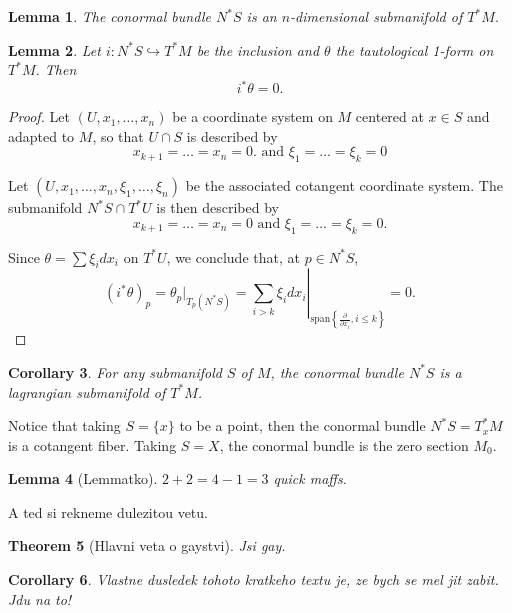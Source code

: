 \documentclass{article}
\newtheorem{theorem}{Theorem}
\newtheorem{lemma}[theorem]{Lemma} %
\newtheorem{corollary}[theorem]{Corollary}
\theoremstyle{definition}
\begin{document}
\begin{lemma}
    The conormal bundle $N^*S$ is an $n$-dimensional submanifold of $T^*M$.
\end{lemma}

\begin{lemma}
    Let $i: N^*S \hookrightarrow T^*M$ be the inclusion and $\theta$ the tautological 1-form on $T^*M$. Then
    \begin{equation*}
        i^*\theta = 0.
    \end{equation*}
\end{lemma}

\begin{proof}
    Let $(U, x_1, \ldots, x_n)$ be a coordinate system on $M$ centered at $x \in S$ and adapted to $M$, so that $U \cap S$ is described by 
    \begin{equation*}
        x_{k+1} = \ldots = x_n = 0. \text{ and } \xi_1 = \ldots = \xi_k = 0
    \end{equation*}

    Let $(U, x_1, \ldots, x_n, \xi_1, \ldots, \xi_n)$ be the associated cotangent coordinate system. The submanifold $N^*S \cap T^*U$ is then described by
    \begin{equation}
        x_{k+1} = \ldots = x_n = 0 \text{ and } \xi_1 = \ldots = \xi_k = 0.
    \end{equation}

    Since $\theta = \sum \xi_i dx_i$ on $T^*U$, we conclude that, at $p \in N^*S$,
    \begin{equation}
        (i^* \theta)_p = \theta_p|_{T_p(N^*S)} = \left. \sum_{i > k} \xi_i dx_i \right|_{\mathrm{span}\left\{\frac{\partial}{\partial x_i}, i \leq k \right\}} = 0.
    \end{equation}
\end{proof}

\begin{corollary}
    For any submanifold $S$ of $M$, the conormal bundle $N^*S$ is a lagrangian submanifold of $T^*M$.
\end{corollary}

Notice that taking $S = \{x\}$ to be a point, then the conormal bundle $N^*S = T^*_xM$ is a cotangent fiber. Taking $S = X$, the conormal bundle is the zero section $M_0$.


\begin{lemma}[Lemmatko]
$2+2 = 4 - 1 = 3$ quick maffs.
\end{lemma}

A ted si rekneme dulezitou vetu.
\begin{theorem}[Hlavni veta o gaystvi]
Jsi gay.
\end{theorem}


\begin{corollary}
    Vlastne dusledek tohoto kratkeho textu je, ze bych se mel jit zabit. Jdu na to!
\end{corollary}
\end{document}
